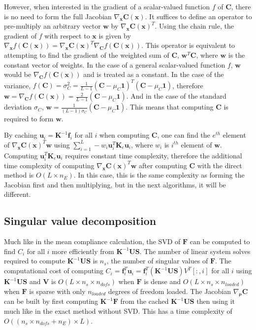     However, when interested in the gradient of a scalar-valued function $f$ of $\bm{C}$, there is no need to form the full Jacobian $\nabla_{\bm{x}} \bm{C}(\bm{x})$. It suffices to define an operator to pre-multiply an arbitrary vector $\bm{w}$ by $\nabla_{\bm{x}} \bm{C}(\bm{x})^T$. Using the chain rule, the gradient of $f$ with respect to $\bm{x}$ is given by $\nabla_{\bm{x}} f(\bm{C}(\bm{x})) = \nabla_{\bm{x}} \bm{C}(\bm{x})^T \nabla_{\bm{C}} f(\bm{C}(\bm{x}))$. This operator is equivalent to attempting to find the gradient of the weighted sum of $\bm{C}$, $\bm{w}^T \bm{C}$, where $\bm{w}$ is the constant vector of weights. In the case of a general scalar-valued function $f$, $\bm{w}$ would be $\nabla_{\bm{C}} f(\bm{C}(\bm{x}))$ and is treated as a constant. In the case of the variance, $f(\bm{C}) = \sigma_C^2 = \frac{1}{L-1} (\bm{C} - \mu_C \bm{1})^T (\bm{C} - \mu_C \bm{1})$, therefore $\bm{w} = \nabla_{\bm{C}} f(\bm{C}(\bm{x})) = \frac{2}{L-1} (\bm{C} - \mu_C \bm{1})$. And in the case of the standard deviation $\sigma_C$, $\bm{w} = \frac{1}{(L-1)\sigma_C} (\bm{C} - \mu_C \bm{1})$. This means that computing $\bm{C}$ is required to form $\bm{w}$.

    By caching $\bm{u}_i = \bm{K}^{-1}\bm{f}_i$ for all $i$ when computing $\bm{C}$, one can find the $e^{th}$ element of $\nabla_{\bm{x}} \bm{C}(\bm{x})^T \bm{w}$ using $\sum_{i=1}^L -w_i \bm{u}_i^T \bm{K}_e \bm{u}_i$, where $w_i$ is $i^{th}$ element of $\bm{w}$. Computing $\bm{u}_i^T \bm{K}_e \bm{u}_i$ requires constant time complexity, therefore the additional time complexity of computing $\nabla_{\bm{x}} \bm{C}(\bm{x})^T \bm{w}$ after computing $\bm{C}$ with the direct method is $O(L \times n_E)$. In this case, this is the same complexity as forming the Jacobian first and then multiplying, but in the next algorithms, it will be different.

  \subsection{Singular value decomposition}

    Much like in the mean compliance calculation, the SVD of $\bm{F}$ can be computed to find $C_i$ for all $i$ more efficiently from $\bm{K}^{-1} \bm{U} \bm{S}$. The number of linear system solves required to compute $\bm{K}^{-1} \bm{U} \bm{S}$ is $n_s$, the number of singular values of $\bm{F}$. The computational cost of computing $C_i = \bm{f}_i^T \bm{u}_i = \bm{f}_i^T (\bm{K}^{-1} \bm{U} \bm{S}) V^T[:,i]$ for all $i$ using $\bm{K}^{-1} \bm{U} \bm{S}$ and $\bm{V}$ is $O(L \times n_s \times n_{dofs})$ when $\bm{F}$ is dense and $O(L \times n_s \times n_{loaded})$ when $\bm{F}$ is sparse with only $n_{loaded}$ degrees of freedom loaded. The Jacobian $\nabla_{\bm{\rho}} \bm{C}$ can be built by first computing $\bm{K}^{-1} \bm{F}$ from the cached $\bm{K}^{-1} \bm{U} \bm{S}$ then using it much like in the exact method without SVD. This has a time complexity of $O((n_s \times n_{dofs} + n_E) \times L)$.

